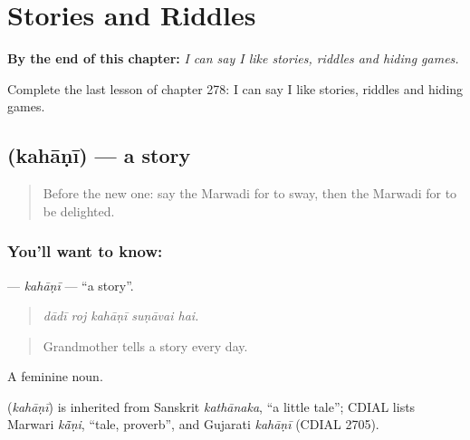 
\chapter{Stories and Riddles}
\label{ch:mw-stories-and-riddles}

\begin{chapteropening}
\textbf{By the end of this chapter:} \emph{I can say I like stories, riddles and hiding games.}

Complete the last lesson of chapter 278: I can say I like stories, riddles and hiding games.
\end{chapteropening}

\section[\texorpdfstring{\mw{कहाणी} (kahāṇī)}{कहाणी (kahāṇī)}]{ (kahāṇī) — a story}

\label{lesson:MW-C278-kahani}



\begin{quote}
Before the new one: say the Marwadi for to sway, then the Marwadi for to be delighted.
\end{quote}

\subsection*{You'll want to know: }
\textbf{} — \emph{kahāṇī} — \textquotedblleft{}a story\textquotedblright{}.

\begin{quote}
    
\end{quote}

\begin{quote}
\emph{dādī roj kahāṇī suṇāvai hai.}
\end{quote}

\begin{quote}
Grandmother tells a story every day.
\end{quote}

A feminine noun.

\begin{cousinweb}
\textbf{} (\emph{kahāṇī}) is inherited from Sanskrit \emph{kathānaka}, \textquotedblleft{}a little tale\textquotedblright{}; CDIAL lists Marwari \emph{kā̃ṇi}, \textquotedblleft{}tale, proverb\textquotedblright{}, and Gujarati \emph{kahāṇī} (CDIAL 2705).
\end{cousinweb}

